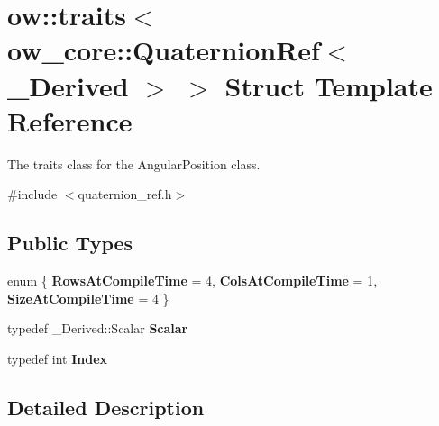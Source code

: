 \hypertarget{structow_1_1traits_3_01ow__core_1_1QuaternionRef_3_01__Derived_01_4_01_4}{}\section{ow\+:\+:traits$<$ ow\+\_\+core\+:\+:Quaternion\+Ref$<$ \+\_\+\+Derived $>$ $>$ Struct Template Reference}
\label{structow_1_1traits_3_01ow__core_1_1QuaternionRef_3_01__Derived_01_4_01_4}


The traits class for the Angular\+Position class.  




{\ttfamily \#include $<$quaternion\+\_\+ref.\+h$>$}

\subsection*{Public Types}
\begin{DoxyCompactItemize}
\item 
enum \{ {\bfseries Rows\+At\+Compile\+Time} = 4, 
{\bfseries Cols\+At\+Compile\+Time} = 1, 
{\bfseries Size\+At\+Compile\+Time} = 4
 \}\hypertarget{structow_1_1traits_3_01ow__core_1_1QuaternionRef_3_01__Derived_01_4_01_4_a9deb17c53b89269e461f76c5da8911ea}{}\label{structow_1_1traits_3_01ow__core_1_1QuaternionRef_3_01__Derived_01_4_01_4_a9deb17c53b89269e461f76c5da8911ea}

\item 
typedef \+\_\+\+Derived\+::\+Scalar {\bfseries Scalar}\hypertarget{structow_1_1traits_3_01ow__core_1_1QuaternionRef_3_01__Derived_01_4_01_4_a299942babe11da5fed7d03533b90e73a}{}\label{structow_1_1traits_3_01ow__core_1_1QuaternionRef_3_01__Derived_01_4_01_4_a299942babe11da5fed7d03533b90e73a}

\item 
typedef int {\bfseries Index}\hypertarget{structow_1_1traits_3_01ow__core_1_1QuaternionRef_3_01__Derived_01_4_01_4_aa7f0708d0f706690f6c63685989d573a}{}\label{structow_1_1traits_3_01ow__core_1_1QuaternionRef_3_01__Derived_01_4_01_4_aa7f0708d0f706690f6c63685989d573a}

\end{DoxyCompactItemize}


\subsection{Detailed Description}
